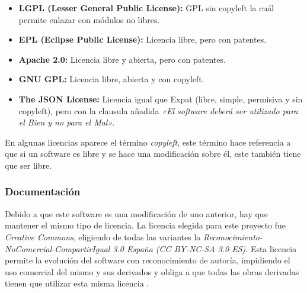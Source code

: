 \begin{itemize}
	\tightlist
	\item
	\textbf{LGPL (Lesser General Public License): } GPL sin copyleft la cuál permite enlazar con módulos no libres.
	\item 
	\textbf{EPL (Eclipse Public License): } Licencia libre, pero con patentes.
	\item 
	\textbf{Apache 2.0: } Licencia libre y abierta, pero con patentes.
	\item 
	\textbf{GNU GPL: } Licencia libre, abierta y con copyleft.
	\item 
	\textbf{The JSON License: } Licencia igual que Expat (libre, simple, permisiva y sin copyleft), pero con la clausula añadida \textit{«El software deberá ser utilizado para el Bien y no para el Mal»}.
\end{itemize}

En algunas licencias aparece el término \textit{copyleft}, este término hace referencia a que si un software es libre y se hace una modificación sobre él, este también tiene que ser libre.

\subsubsection{Documentación}

Debido a que este software es una modificación de uno anterior, hay que mantener el mismo tipo de licencia. La licencia elegida para este proyecto fue \textit{Creative Commons}, eligiendo de todas las variantes la \textit{Reconocimiento-NoComercial-CompartirIgual 3.0 España (CC BY-NC-SA 3.0 ES)}. Esta licencia permite la evolución del software con reconocimiento de autoría, impidiendo el uso comercial del mismo y sus derivados y obliga a que todas  las obras derivadas tienen que utilizar esta misma licencia \cite{creativecommons:info}.

